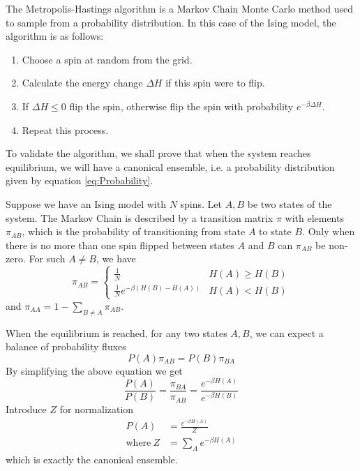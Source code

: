 \documentclass[11pt]{article}
\begin{document}
	The Metropolis-Hastings algorithm is a Markov Chain Monte Carlo method used to sample from a probability distribution. In this case of the Ising model, the algorithm is as follows:
	\begin{enumerate}
		\item Choose a spin at random from the grid.
		\item Calculate the energy change $\Delta H$ if this spin were to flip.
		\item If $\Delta H \leq 0$ flip the spin, otherwise flip the spin with probability $e^{-\beta\Delta H}$.
		\item Repeat this process.
	\end{enumerate}

	To validate the algorithm, we shall prove that when the system reaches equilibrium, we will have a canonical ensemble, i.e. a probability distribution given by equation \eqref{eq:Probability}.
	
	Suppose we have an Ising model with $N$ spins. Let $A, B$ be two states of the system. The Markov Chain is described by a transition matrix $\pi$ with elements $\pi_{AB}$, which is the probability of transitioning from state $A$ to state $B$. Only when there is no more than one spin flipped between states $A$ and $B$ can $\pi_{AB}$ be non-zero. For such $A \neq B$, we have
	\begin{equation}
		\pi_{AB} = \begin{cases}
			\frac{1}{N} & H(A) \geq H(B) \\
			\frac{1}{N} e^{-\beta(H(B) - H(A))} & H(A) < H(B)
		\end{cases}
	\end{equation}
	and $\pi_{AA} = 1 - \sum_{B \neq A} \pi_{AB}$.

	When the equilibrium is reached, for any two states $A, B$, we can expect a balance of probability fluxes
	\begin{equation}
		P(A) \pi_{AB} = P(B) \pi_{BA}
	\end{equation}
	By simplifying the above equation we get
	\begin{equation}
		\frac{P(A)}{P(B)} = \frac{\pi_{BA}}{\pi_{AB}} = \frac{e^{-\beta H(A)}}{e^{-\beta H(B)}}
	\end{equation}
	Introduce $Z$ for normalization
	\begin{equation}
		\begin{aligned}
			P(A) &= \frac{e^{-\beta H(A)}}{Z} \\
			\text{where}\ Z &= \sum_A e^{-\beta H(A)}
		\end{aligned}
	\end{equation}
	which is exactly the canonical ensemble.
\end{document}
